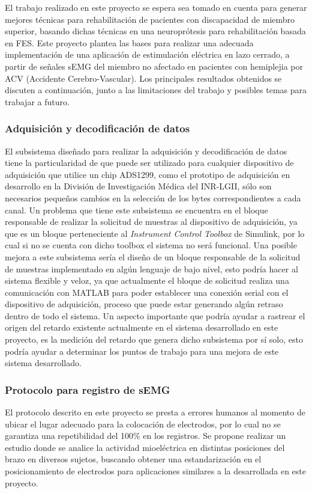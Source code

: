El trabajo realizado en este proyecto se espera sea tomado en cuenta para generar mejores técnicas para rehabilitación de pacientes con discapacidad de miembro superior, basando dichas técnicas en una neuroprótesis para rehabilitación basada en FES. Este proyecto plantea las bases para realizar una adecuada implementación de una aplicación de estimulación eléctrica en lazo cerrado, a partir de señales sEMG del miembro no afectado en pacientes con hemiplejia por ACV (Accidente Cerebro-Vascular). Los principales resultados obtenidos se discuten a continuación, junto a las limitaciones del trabajo y posibles temas para trabajar a futuro.

\subsubsection*{Adquisición y decodificación de datos}
El subsistema diseñado para realizar la adquisición y decodificación de datos tiene la particularidad de que puede ser utilizado para cualquier dispositivo de adquisición que utilice un chip ADS1299, como el prototipo de adquisición en desarrollo en la División de Investigación Médica del INR-LGII, sólo son necesarios pequeños cambios en la selección de los bytes correspondientes a cada canal. Un problema que tiene este subsistema se encuentra en el bloque responsable de realizar la solicitud de muestras al dispositivo de adquisición, ya que es un bloque perteneciente al \emph{Instrument Control Toolbox} de Simulink, por lo cual si no se cuenta con dicho toolbox el sistema no será funcional. Una posible mejora a este subsistema sería el diseño de un bloque responsable de la solicitud de muestras implementado en algún lenguaje de bajo nivel, esto podría hacer al sistema flexible y veloz, ya que actualmente el bloque de solicitud realiza una comunicación con MATLAB para poder establecer una conexión serial con el dispositivo de adquisición, proceso que puede estar generando algún retraso dentro de todo el sistema. Un aspecto importante que podría ayudar a rastrear el origen del retardo existente actualmente en el sistema desarrollado en este proyecto, es la medición del retardo que genera dicho subsistema por sí solo, esto podría ayudar a determinar los puntos de trabajo para una mejora de este sistema desarrollado.

\subsubsection*{Protocolo para registro de sEMG}
El protocolo descrito en este proyecto se presta a errores humanos al momento de ubicar el lugar adecuado para la colocación de electrodos, por lo cual no se garantiza una repetibilidad del 100$\%$ en los registros. Se propone realizar un estudio donde se analice la actividad mioeléctrica en distintas posiciones del brazo en diversos sujetos, buscando obtener una estandarización en el posicionamiento de electrodos para aplicaciones similares a la desarrollada en este proyecto.

